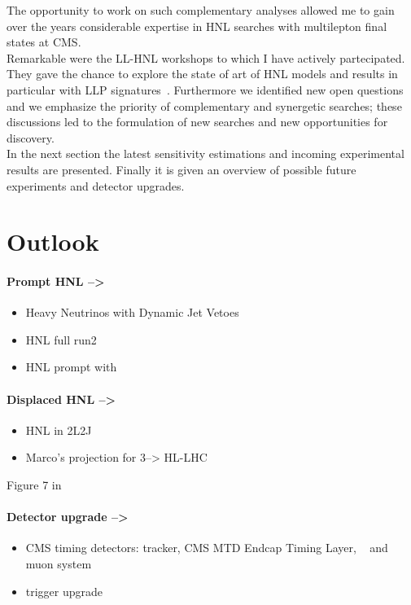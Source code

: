 The opportunity to work on such complementary analyses
allowed me to gain over the years considerable expertise in HNL
searches with multilepton final states at CMS.\\
Remarkable were the LL-HNL workshops to which I have actively
partecipated. They gave the chance to explore the 
state of art of HNL models and results in particular with LLP
signatures~\cite{Alimena_2020}. Furthermore we identified new open questions and
we emphasize the priority 
of complementary and synergetic searches; these discussions
led to the formulation of new searches and new opportunities
for discovery.\\

In the next section the latest sensitivity
estimations and incoming experimental results are presented. Finally
it is given 
an overview of possible future experiments
and detector upgrades. 


\section{Outlook}

\paragraph{Prompt HNL -->}
\begin{itemize}
\item Heavy Neutrinos with Dynamic Jet Vetoes
\item HNL full run2 
\item HNL prompt with \mixpart
\end{itemize}

\paragraph{Displaced HNL -->}
\begin{itemize}
\item HNL in 2L2J
\item Marco's projection for 3\abinv --> HL-LHC
\end{itemize}
Figure 7 in ~\cite{Alimena_2020}

\paragraph{Detector upgrade -->}
\begin{itemize}
\item CMS timing detectors: tracker,  CMS MTD Endcap Timing Layer,
  ~\cite{CERN-LHCC-2017-027} and muon system 
\item trigger upgrade
\end{itemize}

